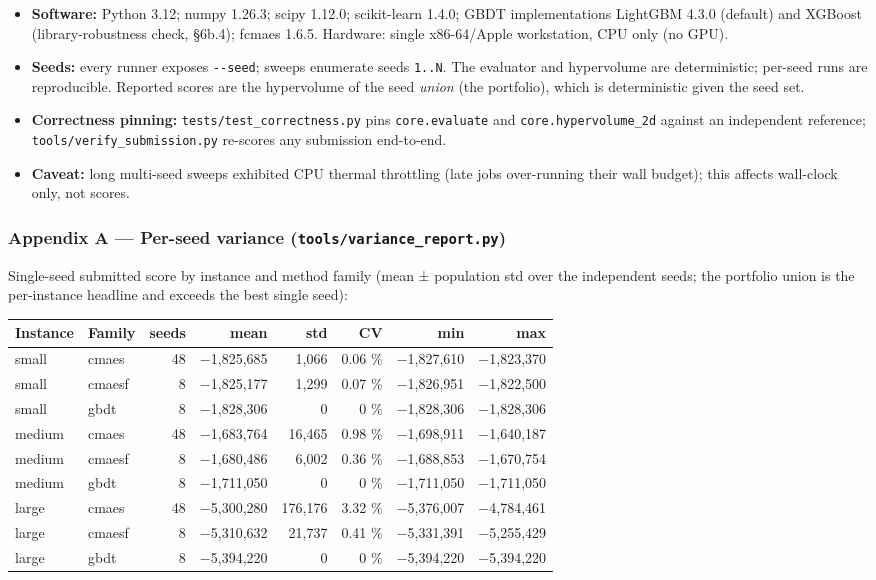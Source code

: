 \documentclass[
  11pt,
]{article}
\providecommand{\tightlist}{%
  \setlength{\itemsep}{0pt}\setlength{\parskip}{0pt}}
\begin{document}
\begin{itemize}
\tightlist
\item
  \textbf{Software:} Python 3.12; numpy 1.26.3; scipy 1.12.0;
  scikit-learn 1.4.0; GBDT implementations LightGBM 4.3.0 (default) and
  XGBoost (library-robustness check, §6b.4); fcmaes 1.6.5. Hardware:
  single x86-64/Apple workstation, CPU only (no GPU).
\item
  \textbf{Seeds:} every runner exposes \texttt{-\/-seed}; sweeps
  enumerate seeds \texttt{1..N}. The evaluator and hypervolume are
  deterministic; per-seed runs are reproducible. Reported scores are the
  hypervolume of the seed \emph{union} (the portfolio), which is
  deterministic given the seed set.
\item
  \textbf{Correctness pinning:} \texttt{tests/test\_correctness.py} pins
  \texttt{core.evaluate} and \texttt{core.hypervolume\_2d} against an
  independent reference; \texttt{tools/verify\_submission.py} re-scores
  any submission end-to-end.
\item
  \textbf{Caveat:} long multi-seed sweeps exhibited CPU thermal
  throttling (late jobs over-running their wall budget); this affects
  wall-clock only, not scores.
\end{itemize}

\hypertarget{appendix-a-per-seed-variance-toolsvariance_report.py}{%
\subsubsection{\texorpdfstring{Appendix A --- Per-seed variance
(\texttt{tools/variance\_report.py})}{Appendix A --- Per-seed variance (tools/variance\_report.py)}}\label{appendix-a-per-seed-variance-toolsvariance_report.py}}

Single-seed submitted score by instance and method family (mean ±
population std over the independent seeds; the portfolio union is the
per-instance headline and exceeds the best single seed):

\begin{longtable}[]{@{}llrrrrrr@{}}
\toprule
Instance & Family & seeds & mean & std & CV & min & max\tabularnewline
\midrule
\endhead
small & cmaes & 48 & −1,825,685 & 1,066 & 0.06 \% & −1,827,610 &
−1,823,370\tabularnewline
small & cmaesf & 8 & −1,825,177 & 1,299 & 0.07 \% & −1,826,951 &
−1,822,500\tabularnewline
small & gbdt & 8 & −1,828,306 & 0 & 0 \% & −1,828,306 &
−1,828,306\tabularnewline
medium & cmaes & 48 & −1,683,764 & 16,465 & 0.98 \% & −1,698,911 &
−1,640,187\tabularnewline
medium & cmaesf & 8 & −1,680,486 & 6,002 & 0.36 \% & −1,688,853 &
−1,670,754\tabularnewline
medium & gbdt & 8 & −1,711,050 & 0 & 0 \% & −1,711,050 &
−1,711,050\tabularnewline
large & cmaes & 48 & −5,300,280 & 176,176 & 3.32 \% & −5,376,007 &
−4,784,461\tabularnewline
large & cmaesf & 8 & −5,310,632 & 21,737 & 0.41 \% & −5,331,391 &
−5,255,429\tabularnewline
large & gbdt & 8 & −5,394,220 & 0 & 0 \% & −5,394,220 &
−5,394,220\tabularnewline
\bottomrule
\end{longtable}
\end{document}
